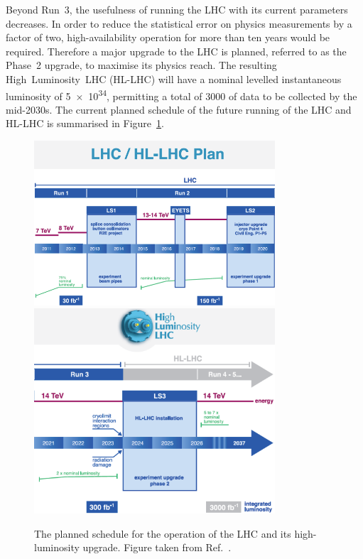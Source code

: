 Beyond Run~3, the usefulness of running the LHC with its current parameters decreases.
In order to reduce the statistical error on physics measurements by a factor of two, high-availability operation for more than ten years would be required.
Therefore a major upgrade to the LHC is planned, referred to as the Phase~2 upgrade, to maximise its physics reach. 
The resulting High~Luminosity~LHC (HL-LHC) \cite{HLLHC} will have a nominal levelled instantaneous luminosity of \SI{5e34}{\lumi}, 
permitting a total of \SI{3000}{\fbinv} of data to be collected by the mid-2030s.
The current planned schedule of the future running of the LHC and HL-LHC is summarised in Figure~\ref{fig:hgcal_LHCschedule}.

\begin{figure}[h!]
  \centering
  \includegraphics[width=0.8\textwidth]{Figures/HGCAL/LHCschedule1.png}
  \includegraphics[width=0.8\textwidth]{Figures/HGCAL/LHCschedule2.png}
  \caption[Planned LHC and HL-LHC schedule.]
  {
    The planned schedule for the operation of the LHC and its high-luminosity upgrade.
    Figure taken from Ref.~\cite{FutureYR}.
  }
  \label{fig:hgcal_LHCschedule}
\end{figure}

